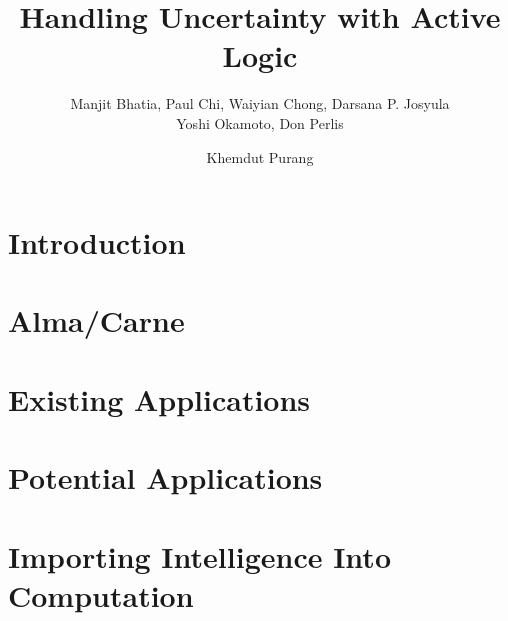 %
%


\title{Handling Uncertainty with Active Logic}
\author{Manjit Bhatia, Paul Chi, Waiyian Chong, Darsana P. Josyula\\
 Yoshi Okamoto, Don Perlis \and Khemdut Purang}



\maketitle

\section{Introduction}


\section{Alma/Carne}


\section{Existing Applications}

%

\section{Potential Applications}


\section{Importing Intelligence Into Computation}







